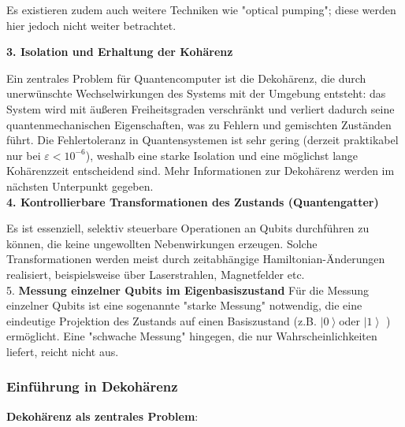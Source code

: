 Es existieren zudem auch weitere Techniken wie "optical pumping"; diese werden hier jedoch nicht weiter betrachtet. 

\cite{lapierre_introduction_2021} 


\textbf{3. Isolation und Erhaltung der Kohärenz} 

Ein zentrales Problem für Quantencomputer ist die Dekohärenz, die durch unerwünschte Wechselwirkungen des Systems mit der Umgebung entsteht: das System wird mit äußeren Freiheitsgraden verschränkt und verliert dadurch seine quantenmechanischen Eigenschaften, was zu Fehlern und gemischten Zuständen führt. Die Fehlertoleranz in Quantensystemen ist sehr gering (derzeit praktikabel nur bei $\varepsilon < 10^{-6}$), weshalb eine starke Isolation und eine möglichst lange Kohärenzzeit entscheidend sind. Mehr Informationen zur Dekohärenz werden im nächsten Unterpunkt gegeben. \\
 
\textbf{4. Kontrollierbare Transformationen des Zustands (Quantengatter)}

Es ist essenziell, selektiv steuerbare Operationen an Qubits durchführen zu können, die keine ungewollten Nebenwirkungen erzeugen. Solche Transformationen werden meist durch zeitabhängige Hamiltonian-Änderungen realisiert, beispielsweise über Laserstrahlen, Magnetfelder etc. \\


5. \textbf{Messung einzelner Qubits im Eigenbasiszustand} 
Für die Messung einzelner Qubits ist eine sogenannte "starke Messung" notwendig, die eine eindeutige Projektion des Zustands auf einen Basiszustand (z.B.  \(\left| 0\right\rangle\)oder \(\left| 1 \right\rangle\) ) ermöglicht. Eine "schwache Messung" hingegen, die nur Wahrscheinlichkeiten liefert, reicht nicht aus. 

\cite{divincenzo_topics_nodate}
 
\subsubsection{Einführung in Dekohärenz }

\textbf{Dekohärenz als zentrales Problem}: 

